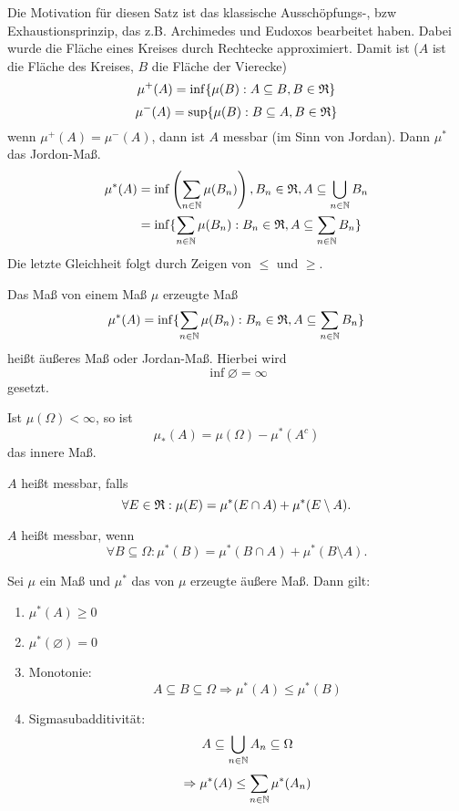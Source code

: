 			\begin{bem}
				Die Motivation für diesen Satz ist das klassische Ausschöpfungs-, bzw Exhaustionsprinzip, das z.B. Archimedes und Eudoxos bearbeitet haben. Dabei wurde die Fläche eines Kreises durch Rechtecke approximiert. Damit ist ($A$ ist die Fläche des Kreises, $B$ die Fläche der Vierecke)
				\[ \mu^+(A)=\inf\{\mu(B):A\subseteq B, B\in\mathfrak{R}\} \]
				\[ \mu^-(A)=\sup\{\mu(B):B\subseteq A, B\in\mathfrak{R}\} \]
				wenn $\mu^+(A)=\mu^-(A)$, dann ist $A$ messbar (im Sinn von Jordan). Dann $\mu^*$ das Jordon-Maß. 
				\begin{align*}
				\mu^*(A) &= \inf\left(\sum_{n\in\mathbb{N}}\mu(B_n)\right), B_n\in\mathfrak{R}, A\subseteq \bigcup_{n\in\mathbb{N}} B_n\\
				&=\inf\{\sum_{n\in\mathbb{N}}\mu(B_n): B_n\in\mathfrak{R}, A\subseteq \sum_{n\in\mathbb{N}} B_n\}
				\end{align*}
				Die letzte Gleichheit folgt durch Zeigen von $\le$ und $\ge$. 
				
			\end{bem}
			
			\begin{defi}
				Das Maß von einem Maß $\mu$ erzeugte Maß
				\[ \mu^*(A) =\inf\{\sum_{n\in\mathbb{N}}\mu(B_n): B_n\in\mathfrak{R}, A\subseteq \sum_{n\in\mathbb{N}} B_n\} \]
				heißt äußeres Maß oder Jordan-Maß. Hierbei wird 
				\[ \inf\varnothing=\infty \]
				gesetzt. 
			\end{defi}
			
			\begin{defi}
				Ist $\mu(\Omega)<\infty$, so ist 
				\[ \mu_*(A)=\mu(\Omega)-\mu^*(A^c) \]
				das innere Maß. 
			\end{defi}
			
			\begin{defi}
				$A$ heißt messbar, falls
				\[ \forall E\in\mathfrak{R}: \mu(E)=\mu^*(E\cap A)+\mu^*(E\setminus A). \]
			\end{defi}
			
			\begin{defi}
				$A$ heißt messbar, wenn
				\[ \forall B\subseteq \Omega: \mu^*(B)=\mu^*(B\cap A)+\mu^*(B\setminus A). \]
			\end{defi}	
			
			\begin{satz}
				Sei $\mu$ ein Maß und $\mu^*$ das von $\mu$ erzeugte äußere Maß. Dann gilt:
				\begin{enumerate}
					\item $\mu^*(A)\ge 0$
					\item $\mu^*(\varnothing)=0$
					\item Monotonie: 
					\[ A\subseteq B\subseteq \Omega \Rightarrow \mu^*(A)\le \mu^*(B) \]
					\item Sigmasubadditivität: 
					\[ A\subseteq \bigcup_{n\in\mathbb{N}} A_n\subseteq \Omega \]
					\[ \Rightarrow \mu^*(A)\le \sum_{n\in\mathbb{N}} \mu^*(A_n) \]
				\end{enumerate}
			\end{satz}
			
